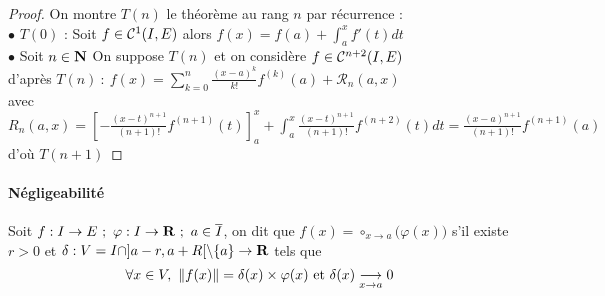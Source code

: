     \begin{proof}
    On montre $T(n)$ le théorème au rang $n$ par récurrence : \\ 
    $\bullet$ $T(0)$ : Soit $f\in{\mathcal{C}}^1(I,E)$ alors $f(x) = f(a) + \int_a^x f'(t) dt$ \\ 
    $\bullet$ Soit $n\in{\mathbf{N}}$ On suppose $T(n)$ et on considère $f\in{\mathcal{C}}^{n+2} (I,E)$ \\
    d'après $T(n) ~:~f(x) = \sum_{k=0}^n \frac{(x-a)^k}{k!} f^{(k)}(a) + \mathcal{R}_n(a,x)$ \\ 
    avec $R_n(a,x) = \left[ -\frac{(x-t)^{n+1}}{(n+1)!} f^{(n+1)} (t) \right]_a^x + \int_a^x \frac{(x-t)^{n+1}}{(n+1)!} f^{(n+2)} (t) dt = \frac{(x-a)^{n+1}}{(n+1)!} f^{(n+1)} (a)$ d'où $T(n+1)$
    \end{proof} \medskip
    
    
    \traitd
    \paragraph{Négligeabilité}
        Soit $f:I\rightarrow E ~;~\varphi : I\rightarrow {\mathbf{R}} ~;~a\in \overline{I}$, on dit que \emph{$f(x) = \circ_{x\rightarrow a} \big( \varphi (x) \big)$} s'il existe $r>0$ et $\delta : V=I\cap ]a-r,a+R[ \backslash\{a\} \rightarrow {\mathbf{R}}$ tels que 
        \[ 
        		\forall x\in V ,~\|f(x)\| = \delta (x) \times \varphi (x) \text{ et } \delta (x) \stox{a} 0 
        	\vspace{-20pt} 
        	\]
	\trait
	
    

